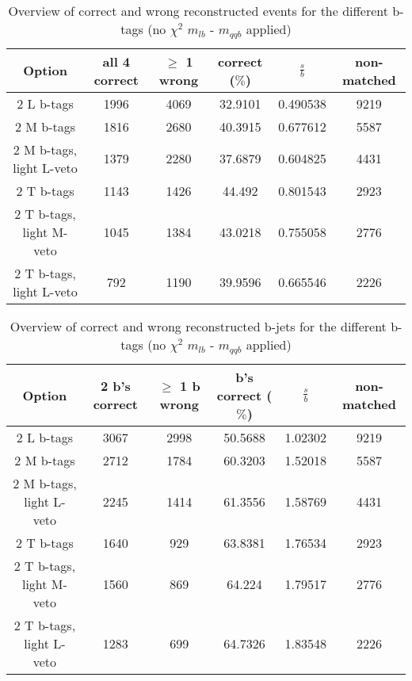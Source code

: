 \begin{table}[!h] 
 \begin{tabular}{c|c|c|c|c|c} 
  \textbf{Option} & all 4 correct & $\geq$ 1 wrong       & correct ($\%$)       & $\frac{s}{b}$ & non-matched \\ \hline 
  2 L b-tags              & 1996 & 4069 & 32.9101 & 0.490538 & 9219\\ 
  2 M b-tags              & 1816 & 2680 & 40.3915 & 0.677612 & 5587\\ 
  2 M b-tags, light L-veto & 1379 & 2280 & 37.6879 & 0.604825 & 4431\\ 
  2 T b-tags              & 1143 & 1426 & 44.492 & 0.801543 & 2923\\ 
  2 T b-tags, light M-veto & 1045 & 1384 & 43.0218 & 0.755058 & 2776\\ 
  2 T b-tags, light L-veto & 792 & 1190 & 39.9596 & 0.665546 & 2226\\ 
 \end{tabular} 
 \caption{Overview of correct and wrong reconstructed events for the different b-tags (no $\chi^{2}$ $m_{lb}$ - $m_{qqb}$ applied)}
\end{table} 
 
\begin{table}[!h] 
 \begin{tabular}{c|c|c|c|c|c} 
  \textbf{Option} & 2 b's correct & $\geq$ 1 b wrong     & b's correct ($\%$)   & $\frac{s}{b}$ & non-matched \\ \hline 
  2 L b-tags              & 3067 & 2998 & 50.5688 & 1.02302 & 9219\\ 
  2 M b-tags              & 2712 & 1784 & 60.3203 & 1.52018 & 5587\\ 
  2 M b-tags, light L-veto & 2245 & 1414 & 61.3556 & 1.58769 & 4431\\ 
  2 T b-tags              & 1640 & 929 & 63.8381 & 1.76534 & 2923\\ 
  2 T b-tags, light M-veto & 1560 & 869 & 64.224 & 1.79517 & 2776\\ 
  2 T b-tags, light L-veto & 1283 & 699 & 64.7326 & 1.83548 & 2226\\ 
 \end{tabular} 
 \caption{Overview of correct and wrong reconstructed b-jets for the different b-tags (no $\chi^{2}$ $m_{lb}$ - $m_{qqb}$ applied)}
\end{table} 
 
